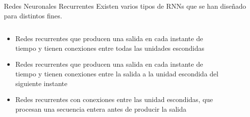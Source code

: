 \documentclass[handout, 9pt]{beamer}
\begin{document}
\begin{frame}{Redes Neuronales Recurrentes}
Existen varios tipos de RNNs que se han diseñado para distintos fines. \pause

\begin{columns}
  \begin{column}{0.5\textwidth}
    \begin{itemize}
      \item Redes recurrentes que producen una salida en cada instante de tiempo y tienen conexiones entre todas las unidades escondidas \pause
      \item Redes recurrentes que producen una salida en cada instante de tiempo y tienen conexiones entre la salida a la unidad escondida del siguiente instante \pause
      \item Redes recurrentes con conexiones entre las unidad escondidas, que procesan una secuencia entera antes de producir la salida \pause
    \end{itemize}

  \end{column}

  \begin{column}{0.5\textwidth}

    \begin{figure}[H]
    \captionsetup{font=small,labelfont=small}
    \centering
    \end{figure}

  \end{column}

\end{columns}


\end{frame}
\end{document}
